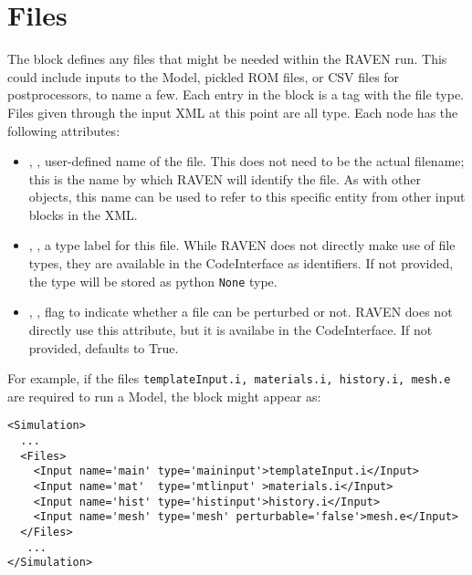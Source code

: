 \section{Files}
\label{sec:files}

The  block defines any files that might be needed within
the RAVEN run.  This could include inputs to the Model, pickled ROM files,
or CSV files for postprocessors, to name a few.
%
Each entry in the  block is a tag with the file type.  Files
given through the input XML at this point are all  type.
Each  node has the following attributes:
\vspace{-5mm}
\begin{itemize}
  \itemsep0em
  \item {}, , user-defined name
  of the file.  This does not need to be the actual filename; this is the name
  by which RAVEN will identify the file.
  \nb As with other objects, this name can be used to refer to this
  specific entity from other input blocks in the XML.
  \item {}, , a type label
  for this file.  While RAVEN does not directly make use of file types, 
  they are available in the CodeInterface as identifiers.  If not provided,
  the type will be stored as python \texttt{None} type.

  \item {}, , flag
  to indicate whether a file can be perturbed or not. RAVEN does not
  directly use this attribute, but it is availabe in the CodeInterface.
  If not provided, defaults to True.
\end{itemize}
\vspace{-5mm}
For example, if the files \texttt{templateInput.i, materials.i, history.i, mesh.e}
 are required to run a Model, the  block might appear as:
\begin{lstlisting}[style=XML,morekeywords={name,file}] %moreemph={name,file}]
<Simulation>
  ...
  <Files>
    <Input name='main' type='maininput'>templateInput.i</Input>
    <Input name='mat'  type='mtlinput' >materials.i</Input>
    <Input name='hist' type='histinput'>history.i</Input>
    <Input name='mesh' type='mesh' perturbable='false'>mesh.e</Input>
  </Files>
   ...
</Simulation>
\end{lstlisting}
